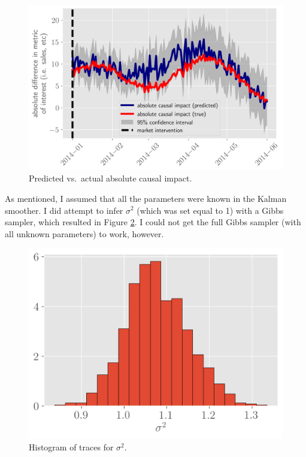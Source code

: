 \documentclass[12pt]{article}
\begin{document}
\begin{figure}[!h]
    \centering
    \includegraphics[scale=.5
    ]{../figures/diff.png}
    \caption{Predicted vs.\ actual absolute causal impact.}
    \label{diff}
\end{figure}
\newpage
As mentioned, I assumed that all the parameters were known in the Kalman smoother. I did attempt to infer $\sigma^2$ (which was set equal to 1) with a Gibbs sampler, which resulted in Figure \ref{sig}. I could not get the full Gibbs sampler (with all unknown parameters) to work, however.

\begin{figure}[!h]
    \centering
    \includegraphics[scale=.6
    ]{../figures/sigma.png}
    \caption{Histogram of traces for $\sigma^2$.}
    \label{sig}
\end{figure}
\newpage
\end{document}
